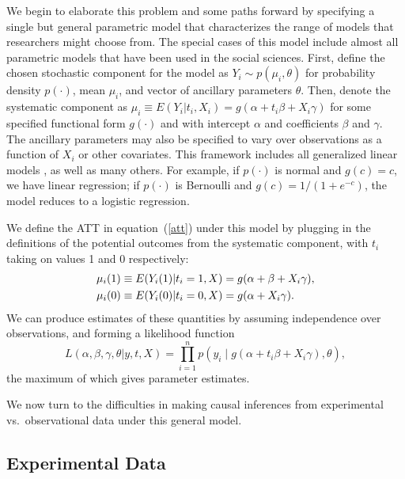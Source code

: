 \documentclass[11pt,titlepage]{article}
\begin{document}
We begin to elaborate this problem and some paths forward by
specifying a single but general parametric model that characterizes
the range of models that researchers might choose from.  The special
cases of this model include almost all parametric models that have
been used in the social sciences.  First, define the chosen stochastic
component for the model as $Y_i \sim p(\mu_i,\theta)$ for probability
density $p(\cdot)$, mean $\mu_i$, and vector of ancillary parameters
$\theta$.  Then, denote the systematic component as $\mu_i\equiv
E(Y_i|t_i,X_i)=g(\alpha + t_i\beta + X_i\gamma)$ for some specified
functional form $g(\cdot)$ and with intercept $\alpha$ and
coefficients $\beta$ and $\gamma$.  The ancillary parameters may also
be specified to vary over observations as a function of $X_i$ or other
covariates.  This framework includes all generalized linear models
\citep{McCNel89}, as well as many others.  For example, if $p(\cdot)$
is normal and $g(c)=c$, we have linear regression; if $p(\cdot)$ is
Bernoulli and $g(c)=1/(1+e^{-c})$, the model reduces to a logistic
regression.

We define the ATT in equation~(\ref{att}) under this model by plugging
in the definitions of the potential outcomes from the systematic
component, with $t_i$ taking on values 1 and 0 respectively:
\begin{align}
  \label{matt}
\mu_i(1)&\equiv E(Y_i(1)|t_i=1,X)= g(\alpha + \beta + X_i\gamma),\notag \\
\mu_i(0)&\equiv E(Y_i(0)|t_i=0,X) = g(\alpha + X_i\gamma).
\end{align}
We can produce estimates of these quantities by assuming independence
over observations, and forming a likelihood function
\begin{equation}
  \label{lik}
  L(\alpha,\beta,\gamma,\theta|y, t, X) = \prod_{i=1}^n 
  p\left(y_i \mid g(\alpha + t_i\beta + X_i\gamma), \theta\right),
\end{equation}
the maximum of which gives parameter estimates.

We now turn to the difficulties in making causal inferences from
experimental vs.\ observational data under this general model.

\subsection{Experimental Data}\label{s:paraexp}
\end{document}
